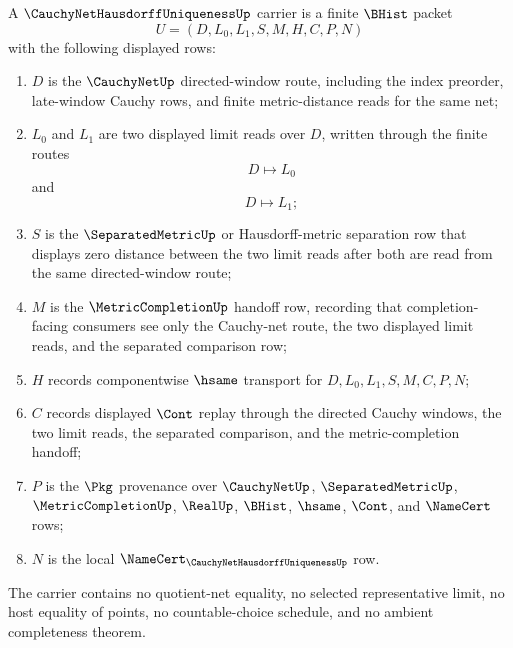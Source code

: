 \begin{definition}
\label{def:cauchy-net-hausdorff-uniqueness-carrier}
A $\CauchyNetHausdorffUniquenessUp$ carrier is a finite $\BHist$ packet
$$
U=(D,L_0,L_1,S,M,H,C,P,N)
$$
with the following displayed rows:
\begin{enumerate}
\item $D$ is the $\CauchyNetUp$ directed-window route, including the index preorder, late-window Cauchy rows, and finite metric-distance reads for the same net;
\item $L_0$ and $L_1$ are two displayed limit reads over $D$, written through the finite routes
$$
D \longmapsto L_0
$$
and
$$
D \longmapsto L_1;
$$
\item $S$ is the $\SeparatedMetricUp$ or Hausdorff-metric separation row that displays zero distance between the two limit reads after both are read from the same directed-window route;
\item $M$ is the $\MetricCompletionUp$ handoff row, recording that completion-facing consumers see only the Cauchy-net route, the two displayed limit reads, and the separated comparison row;
\item $H$ records componentwise $\hsame$ transport for $D,L_0,L_1,S,M,C,P,N$;
\item $C$ records displayed $\Cont$ replay through the directed Cauchy windows, the two limit reads, the separated comparison, and the metric-completion handoff;
\item $P$ is the $\Pkg$ provenance over $\CauchyNetUp$, $\SeparatedMetricUp$, $\MetricCompletionUp$, $\RealUp$, $\BHist$, $\hsame$, $\Cont$, and $\NameCert$ rows;
\item $N$ is the local $\NameCert_{\CauchyNetHausdorffUniquenessUp}$ row.
\end{enumerate}
The carrier contains no quotient-net equality, no selected representative limit, no host equality of points, no countable-choice schedule, and no ambient completeness theorem.
\end{definition}

